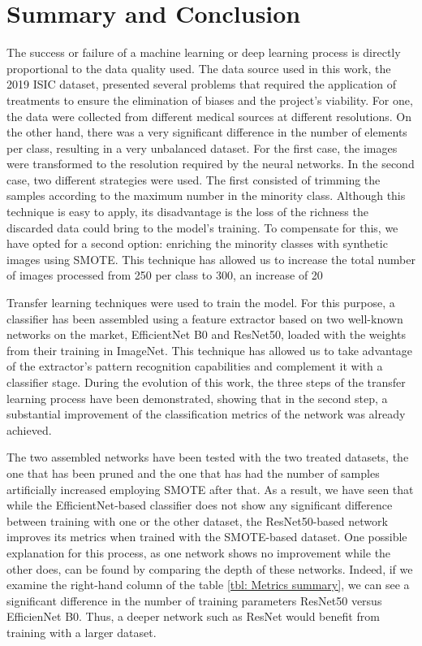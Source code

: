\chapter{Summary and Conclusion}
\label{chapter: Conclusion}

The success or failure of a machine learning or deep learning process is directly proportional to the data quality used. The data source used in this work, the 2019 ISIC dataset, presented several problems that required the application of treatments to ensure the elimination of biases and the project's viability. For one, the data were collected from different medical sources at different resolutions. On the other hand, there was a very significant difference in the number of elements per class, resulting in a very unbalanced dataset. For the first case, the images were transformed to the resolution required by the neural networks. In the second case, two different strategies were used. The first consisted of trimming the samples according to the maximum number in the minority class. Although this technique is easy to apply, its disadvantage is the loss of the richness the discarded data could bring to the model's training. To compensate for this, we have opted for a second option: enriching the minority classes with synthetic images using SMOTE. This technique has allowed us to increase the total number of images processed from 250 per class to 300, an increase of 20%

Transfer learning techniques were used to train the model. For this purpose, a classifier has been assembled using a feature extractor based on two well-known networks on the market, EfficientNet B0 and ResNet50, loaded with the weights from their training in ImageNet. This technique has allowed us to take advantage of the extractor's pattern recognition capabilities and complement it with a classifier stage. During the evolution of this work, the three steps of the transfer learning process have been demonstrated, showing that in the second step, a substantial improvement of the classification metrics of the network was already achieved.

The two assembled networks have been tested with the two treated datasets, the one that has been pruned and the one that has had the number of samples artificially increased employing SMOTE after that. As a result, we have seen that while the EfficientNet-based classifier does not show any significant difference between training with one or the other dataset, the ResNet50-based network improves its metrics when trained with the SMOTE-based dataset. One possible explanation for this process, as one network shows no improvement while the other does, can be found by comparing the depth of these networks. Indeed, if we examine the right-hand column of the table \ref{tbl: Metrics summary}, we can see a significant difference in the number of training parameters ResNet50 versus EfficienNet B0. Thus, a deeper network such as ResNet would benefit from training with a larger dataset.

